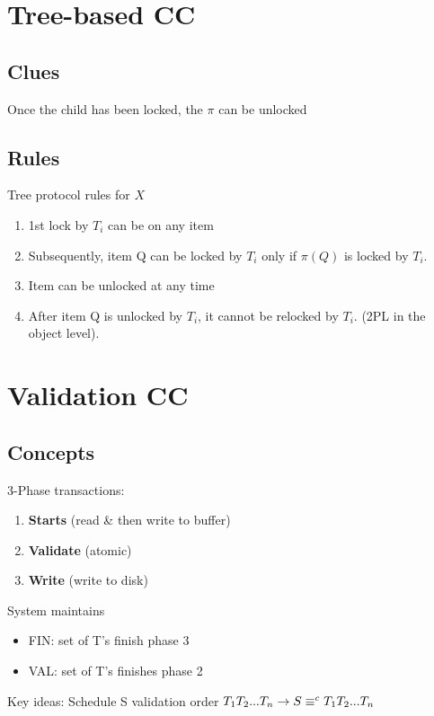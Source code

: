 \documentclass[a4paper]{report}
\begin{document}
\section{Tree-based CC}
\subsection{Clues}
Once the child has been locked, the $\pi$ can be unlocked
\subsection{Rules}
Tree protocol rules for $X$ 
\begin{enumerate}
\item 1st lock by $T_i$ can be on any item 
\item Subsequently, item Q can be locked by $T_i$ only if $\pi(Q)$ is locked by $T_i$.
\item Item can be unlocked at any time
\item After item Q is unlocked by $T_i$, it cannot be relocked by $T_i$. (2PL in the object level). 
\end{enumerate}
\section{Validation CC}
\subsection{Concepts}
3-Phase transactions:
\begin{enumerate}
\item \textbf{Starts} (read \& then write to buffer)
\item \textbf{Validate} (atomic)
\item \textbf{Write} (write to disk)
\end{enumerate}
System maintains 
\begin{itemize}
\item FIN: set of T's finish phase 3
\item VAL: set of T's finishes phase 2
\end{itemize}
Key ideas:
Schedule S validation order $T_1T_2...T_n \rightarrow S\equiv^c T_1T_2...T_n$
\end{document}
